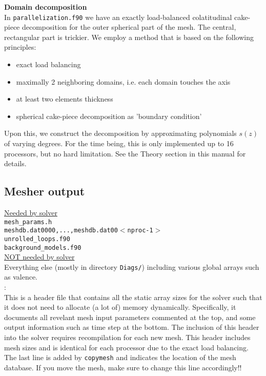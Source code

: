 \documentclass[11pt,letter,fleqn,english,notitlepage]{article}
\begin{document}
\noindent\textbf{Domain decomposition }\\
In {\tt parallelization.f90} we have an exactly load-balanced colatitudinal cake-piece decomposition 
for the outer spherical part of the mesh. The central, rectangular part is trickier. 
We employ a method that is based on the following principles:
\begin{itemize}
\item exact load balancing 
\item maximally 2 neighboring domains, i.e. each domain touches the axis
\item at least two elements thickness
\item spherical cake-piece decomposition as 'boundary condition'
\end{itemize}
Upon this, we construct the decomposition by approximating polynomials $s(z)$
of varying degrees. For the time being, this is only implemented up to 
16 processors, but no hard limitation. See the Theory section in this manual for details.

\subsection{Mesher output}
\underline{Needed by solver} \\
{\tt mesh\_params.h}\\
{\tt meshdb.dat0000,...,meshdb.dat00$<$nproc-1$>$}\\
{\tt unrolled\_loops.f90}\\
{\tt background\_models.f90}\\

\noindent\underline{NOT needed by solver }\\
Everything else (mostly in directory {\tt Diags/}) including various global 
arrays such as valence.\\

: \\
This is a header file that contains all the static array 
sizes for the solver such that it does not need to allocate (a lot of) 
memory dynamically. Specifically, it documents all revelant mesh input 
parameters commented at the top, and some output information such as 
time step at the bottom.  The inclusion of this header into the solver 
requires recompilation for each new mesh. This header includes 
mesh sizes and is identical for each processor due to the exact load balancing.
The last line is added by {\tt copymesh} and indicates the location of the mesh 
database. If you move the mesh, make sure to change this line accordingly!!
\\
\end{document}
